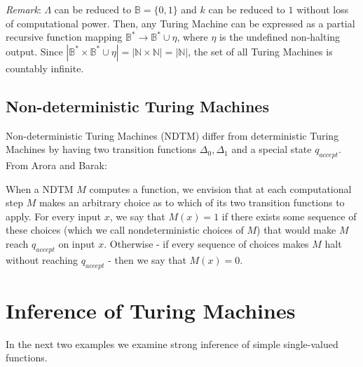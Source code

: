\documentclass[11pt]{article}
\newcommand{\N}{\mathbb{N}}
\newcommand{\B}{\mathbb{B}}
\begin{document}
\bigbreak

\textit{Remark}: $\Lambda$ can be reduced to $ \B = \{0, 1\} $ and $ k $ can be reduced to $ 1 $ without loss of computational power. Then, any Turing Machine can be expressed as a partial recursive function mapping $ \B^{*} \rightarrow \B^{*} \cup \eta $, where $ \eta $ is the undefined non-halting output. Since $ |\B^{*} \times \B^{*} \cup \eta | = | \N \times \N | = | \N | $, the set of all Turing Machines is countably infinite. 

\subsection{Non-deterministic Turing Machines} 

Non-deterministic Turing Machines (NDTM) differ from deterministic Turing Machines by having two transition functions $ \Delta_0, \Delta_1 $ and a special state $ q_{accept} $. From Arora and Barak:

\begin{displayquote}
When a NDTM $M$ computes a function, we envision that at each computational step $ M $ makes an arbitrary choice as to which of its two transition functions to apply. For every input $ x $, we say that $ M(x) = 1 $ if there exists some sequence of these choices (which we call nondeterministic choices of $ M $) that would make $ M $ reach $ q_{accept} $ on input $ x $. Otherwise - if every sequence of choices makes $ M $ halt without reaching $ q_{accept} $ - then we say that $ M(x) = 0 $.
\end{displayquote}


\section{Inference of Turing Machines} 
 
 In the next two examples we examine strong inference of simple single-valued functions. \\
 
\end{document}
